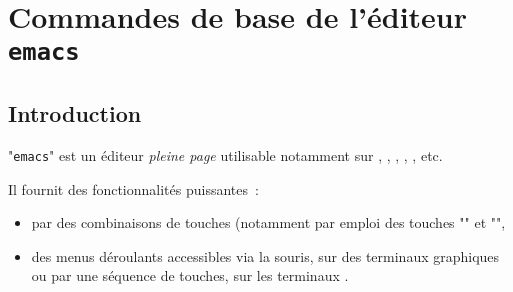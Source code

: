 %
%

\section{\texorpdfstring{Commandes de base de l'{\'e}diteur {\tt emacs}}{Commandes de base de l'{\'e}diteur emacs}}
\renewcommand{\arraystretch}{1.5}

\subsection{Introduction}

"{\tt emacs}" est un {\'e}diteur {\sl pleine page} utilisable notamment sur
{\Unix}, {\OpenVMS}, {\DOS}, {\Windows}, {\MacOS}, etc.

Il fournit des fonctionnalit{\'e}s puissantes~:
\begin{itemize}
	\item	par des combinaisons de touches (notamment par emploi des touches
			"\ctrlkey" et "\esckey",
	\item	des menus d{\'e}roulants accessibles via la souris, sur des terminaux
			graphiques ou par une s{\'e}quence de touches, sur les terminaux
			{\ASCII}.
\end{itemize}

